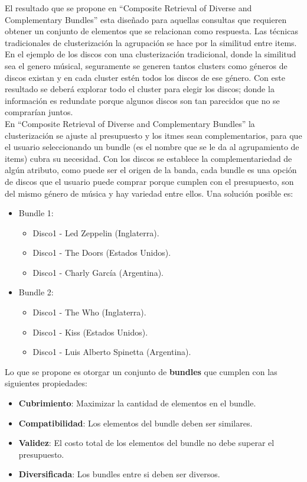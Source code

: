 El resultado que se propone en ``Composite Retrieval of Diverse and Complementary Bundles'' esta diseñado para aquellas consultas 
que requieren obtener un conjunto de elementos que se relacionan como respuesta. Las técnicas tradicionales de 
clusterización la agrupación se hace por la similitud entre items. En el ejemplo de los discos con una clusterización tradicional,
donde la similitud sea el genero músical, seguramente se generen tantos clusters como géneros de discos existan y en cada cluster estén todos 
los discos de ese género. Con este resultado se deberá explorar todo el cluster para elegir los discos; donde la información es redundate 
porque algunos discos son tan parecidos que no se comprarían juntos.\\

En ``Composite Retrieval of Diverse and Complementary Bundles'' la clusterización se ajuste al presupuesto y los itmes sean complementarios, 
para que el usuario seleccionando un bundle (es el nombre que se le da al agrupamiento de items) cubra su necesidad. Con los discos 
se establece la complementariedad de algún atributo, como puede ser el origen de la banda, cada bundle es una opción de discos que el usuario 
puede comprar porque cumplen con el presupuesto, son del mismo género de música y hay variedad entre ellos. Una solución posible es:
\begin{itemize}
  \item Bundle 1:
  \begin{itemize}
    \item Disco1 - Led Zeppelin (Inglaterra).
    \item Disco1 - The Doors (Estados Unidos).
    \item Disco1 - Charly García (Argentina).
  \end{itemize}
  \item Bundle 2:
  \begin{itemize}
    \item Disco1 - The Who (Inglaterra).
    \item Disco1 - Kiss (Estados Unidos).
    \item Disco1 - Luis Alberto Spinetta (Argentina).
  \end{itemize}
\end{itemize}

Lo que se propone es otorgar un conjunto de \textbf{bundles} que cumplen con las siguientes propiedades:
\begin{itemize}
  \item \textbf{Cubrimiento}: Maximizar la cantidad de elementos en el bundle.
  \item \textbf{Compatibilidad}: Los elementos del bundle deben ser similares.
  \item \textbf{Validez}: El costo total de los elementos del bundle no debe superar el presupuesto.
  \item \textbf{Diversificada}: Los bundles entre si deben ser diversos.
\end{itemize}


